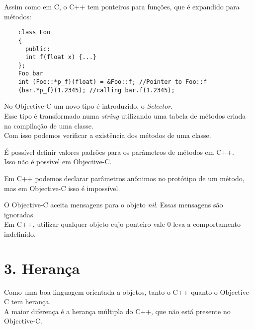 \documentclass[brazil]{beamer}
\begin{document}
\begin{frame}[fragile]
  Assim como em C, o C++ tem ponteiros para funções, que é expandido para métodos:
  \lstset{language=C++,basicstyle=\scriptsize}
  \begin{lstlisting}
    class Foo
    {
      public:
      int f(float x) {...}
    };
    Foo bar
    int (Foo::*p_f)(float) = &Foo::f; //Pointer to Foo::f
    (bar.*p_f)(1.2345); //calling bar.f(1.2345);
  \end{lstlisting}
\end{frame}

\begin{frame}
  No Objective-C um novo tipo é introduzido, o \textit{Selector}. \\
  Esse tipo é transformado numa \textit{string} utilizando uma tabela de métodos criada na compilação de uma classe. \\
  Com isso podemos verificar a existência dos métodos de uma classe.
\end{frame}

\begin{frame}
  É possível definir valores padrões para os parâmetros de métodos em C++.\\
  Isso não é possível em Objective-C. \\
\end{frame}

\begin{frame}
  Em C++ podemos declarar parâmetros anônimos no protótipo de um método, mas em Objective-C isso é impossível.
\end{frame}

\begin{frame}
  O Objective-C aceita mensagens para o objeto \textit{nil}. Essas mensagens são ignoradas. \\
  Em C++, utilizar qualquer objeto cujo ponteiro vale 0 leva a comportamento indefinido.
\end{frame}

\section{3. Herança}

\begin{frame}
  Como uma boa linguagem orientada a objetos, tanto o C++ quanto o Objective-C tem herança. \\
  A maior diferença é a herança múltipla do C++, que não está presente no Objective-C.
\end{frame}
\end{document}
